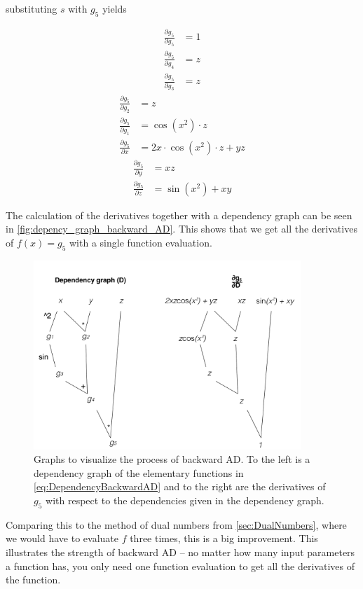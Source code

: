 substituting $s$ with $g_5$ yields
\begin{multicols}{3}
    \noindent
    \begin{align*}
        \frac{\partial g_5}{\partial g_5} &= 1\\
        \frac{\partial g_5}{\partial g_4} &= z\\
        \frac{\partial g_5}{\partial g_3} &= z
    \end{align*}
    \begin{align*}
        \frac{\partial g_5}{\partial g_2} &= z\\
        \frac{\partial g_5}{\partial g_1} &= \cos(x^2)\cdot z\\
        \frac{\partial g_5}{\partial x}   &= 2x\cdot\cos(x^2)\cdot z + yz
    \end{align*}
    \begin{align*}
        \frac{\partial g_5}{\partial y}   &= xz\\
        \frac{\partial g_5}{\partial z}   &= \sin(x^2)+xy
    \end{align*}
\end{multicols}
The calculation of the derivatives together with a dependency graph can be seen in \autoref{fig:depency_graph_backward_AD}. This shows that we get all the derivatives of $f(x) = g_5$ with a single function evaluation.
\begin{figure}[H]
	\centering
	    \includegraphics[width = 0.9\textwidth]{figures/dependency_graph_backward_AD.pdf}
 	    \caption{Graphs to visualize the process of backward AD. To the left is a dependency graph of the elementary functions in \eqref{eq:DependencyBackwardAD} and to the right are the derivatives of $g_5$ with respect to the dependencies given in the dependency graph.}
	\label{fig:depency_graph_backward_AD}
\end{figure}
Comparing this to the method of dual numbers from \autoref{sec:DualNumbers}, where we would have to evaluate $f$ three times, this is a big improvement. This illustrates the strength of backward AD -- no matter how many input parameters a function has, you only need one function evaluation to get all the derivatives of the function. 

